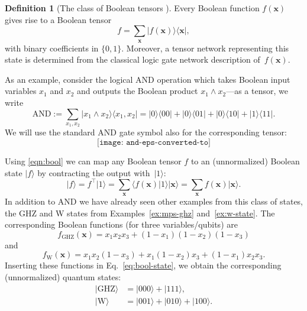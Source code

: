 \documentclass[aps,pra,12pt,nofootinbib,superscriptaddress,longbibliography]{revtex4-1}
\theoremstyle{plain}
\theoremstyle{definition}
\newtheorem{definition}[theorem]{Definition}
\newcommand{\bra}[1]{\mbox{$\langle #1|$}}
\newcommand{\ket}[1]{\mbox{$|#1\rangle$}}
\newcommand{\braket}[2]{\mbox{$\langle #1|#2\rangle$}}
\newcommand{\ketbra}[2]{\mbox{$|#1\rangle\langle #2|$}}
\newcommand{\x}{\mathbf{x}}
\newcommand{\I}{\openone}     %
\newcommand{\be}{\begin{equation}}
\newcommand{\ee}{\end{equation}}
\begin{document}
\begin{definition}[The class of Boolean tensors \cite{VTN,BMT15}]
Every Boolean function
$f(\x)$ gives rise to a Boolean tensor
\begin{equation}\label{eqn:bool}
 f = \sum_{\x} \ketbra{f(\x)}{\x},
\end{equation}
with binary coefficients in $\{0,1\}$. 
Moreover, a tensor network representing this state is determined from the classical logic gate network description of~$f(\x)$.
\label{remark:boolean}
\end{definition}
As an example, consider the logical AND operation which takes Boolean input variables $x_1$ and $x_2$ and outputs the Boolean product $x_1\wedge x_2$---as a tensor, we write 
\begin{equation}
 \text{AND} := \sum_{x_1, x_2} \ketbra{x_1\wedge x_2}{x_1, x_2} = \ketbra{0}{00} + \ketbra{0}{01} + \ketbra{0}{10} +\ketbra{1}{11}.
\end{equation}
We will use the standard AND gate symbol also for the corresponding tensor:
\be
 \texttt{[image: and-eps-converted-to]}
\ee

Using \eqref{eqn:bool} we can map any Boolean tensor $f$ to an (unnormalized) Boolean state $\ket{f}$ by contracting the output with~$\ket{1}$:
\be
\label{eq:bool-state}
\ket{f} = f^\top \ket{1} =
\sum_{\x} \braket{f(\x)}{1}\ket{\x}
= \sum_{\x} f(\x) \ket{\x}.
\ee
In addition to AND we have already seen other examples from this class of states,
the GHZ and W states from Examples~\ref{ex:mps-ghz} and~\ref{ex:w-state}.
The corresponding Boolean functions (for three variables/qubits) are
\begin{equation}
f_\text{GHZ}(\x) = x_1x_2x_3 +(1-x_1)(1-x_2)(1-x_3)
\end{equation}
and
\begin{equation}
f_\text{W}(\x) =  x_1x_2(1-x_3) + x_1(1-x_2)x_3 + (1-x_1)x_2x_3.
\end{equation}
Inserting these functions in Eq.~\eqref{eq:bool-state}, we obtain the corresponding (unnormalized) quantum states:
\begin{align}
  \ket{\text{GHZ}} &= \ket{000}+\ket{111},\\
  \ket{\text{W}}   &= \ket{001}+\ket{010}+\ket{100}.
\end{align}
\end{document}
